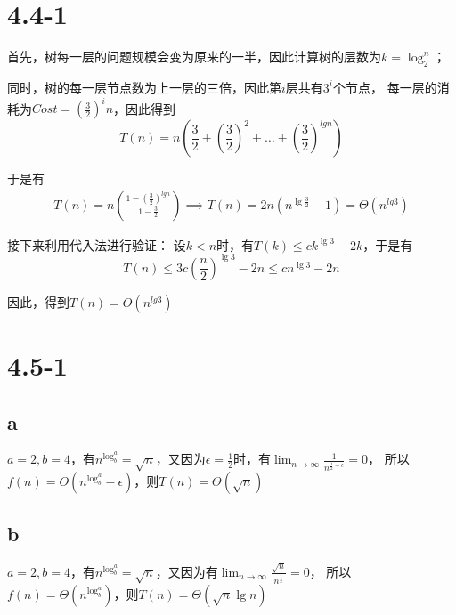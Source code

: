 \documentclass[UTF8]{ctexart}
\title{}
\author{张配天-2018202180}
\begin{document}
    \maketitle
    \section*{4.4-1}
    首先，树每一层的问题规模会变为原来的一半，因此计算树的层数为$k = \log_2^n$；
    \par 同时，树的每一层节点数为上一层的三倍，因此第$i$层共有$3^i$个节点，
    每一层的消耗为$Cost = (\frac{3}{2})^i n$，因此得到\begin{equation}
        T(n) = n(\frac{3}{2} + (\frac{3}{2})^2 + \dots + (\frac{3}{2})^{lgn})
    \end{equation}
    \par 于是有
    \begin{gather}
        T(n) = n(\frac{1-(\frac{3}{2})^{lgn}}{1-\frac{3}{2}})
        \implies T(n) = 2n(n^{\lg{\frac{3}{2}}} - 1) = \Theta (n^{lg3})
    \end{gather}
    \par 接下来利用代入法进行验证：
    设$k<n$时，有$T(k) \leq ck^{\lg{3}}-2k$，于是有
    \begin{equation}
        T(n) \leq 3c(\frac{n}{2})^{\lg{3}} - 2n \leq cn^{\lg{3}}-2n
    \end{equation}
    \par 因此，得到$T(n) = O(n^{lg3})$
    \section*{4.5-1}
    \subsection*{a}
    $a = 2,b=4$，有$n^{\log_b^a} = \sqrt{n}$，又因为$\epsilon=\frac{1}{2}$时，有$\lim_{n\to \infty}\frac{1}{n^{\frac{1}{2}-\epsilon}} = 0$，
    所以$f(n) = O(n^{\log_b^a} - \epsilon)$，则$T(n) = \Theta(\sqrt{n})$
    \subsection*{b}
    $a = 2,b=4$，有$n^{\log_b^a} = \sqrt{n}$，又因为有$\lim_{n\to \infty}\frac{\sqrt{n}}{n^{\frac{1}{2}}} = 0$，
    所以$f(n) = \Theta(n^{\log_b^a})$，则$T(n) = \Theta(\sqrt{n}\lg{n})$
    
\end{document}
